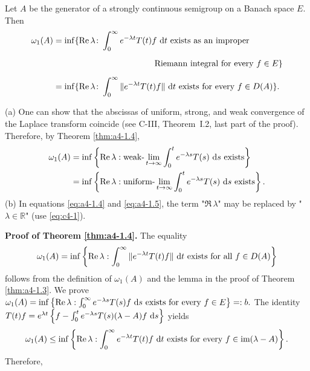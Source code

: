 \begin{theorem}\label{thm:a4-1.4}
Let $A$ be the generator of a strongly continuous semigroup on a Banach space $E$. 
Then
\begin{align}\label{eq:a4-1.4}
\omega_{1}(A) &= \inf\{\Re\,\lambda \colon \int_{0}^{\infty} e^{-\lambda t} T(t)f \,\dt \text{ exists as an improper} \\
&\phantom{= \inf\{\Re\,\lambda \colon \int_{0}^{\infty} e^{-\lambda t} T(t)f} \text{Riemann integral for every } f \in E\} \notag \\
&= \inf\{\Re\,\lambda \colon \int_{0}^{\infty} \|e^{-\lambda t} T(t)f\| \,\dt \text{ exists for every } f \in D(A)\}.\notag
\end{align}
\end{theorem}
\begin{remarks*}\label{rem:a4-1.4}
(a) One can show that the abscissas of uniform, strong, and weak convergence of the Laplace transform coincide (see C-III, Theorem~I.2, last part of the proof). 
Therefore, by Theorem \ref{thm:a4-1.4},
\begin{align}\label{eq:a4-1.5}
\omega_1(A) &= \inf \left\{ \mathop{}\!\mathrm{Re}\,\lambda : \text{weak-} \lim_{t \to \infty} \int_0^t e^{-\lambda s} T(s) \,\mathop{}\!\mathrm{d}{s} \text{ exists} \right\}
\\
    &= \inf \left\{ \mathop{}\!\mathrm{Re}\,\lambda : \text{uniform-} \lim_{t \to \infty} \int_0^t e^{-\lambda s} T(s) \,\mathop{}\!\mathrm{d}{s} \text{ exists} \right\}.\notag
\end{align}
\noindent
(b) In equations \eqref{eq:a4-1.4} and \eqref{eq:a4-1.5}, the term "\(\Re\,\lambda\)" may be replaced by "\(\lambda \in \mathbb{R}\)" (use \eqref{eq:c4-1}).
\end{remarks*}
\bigskip
\noindent
 \textbf{Proof of Theorem \ref{thm:a4-1.4}.} The equality 
 \[ 
 \omega_1(A) = \inf \left\{ \mathop{}\!\mathrm{Re}\,\lambda : \int_0^\infty \|e^{-\lambda t} T(t) f \| \,\mathop{}\!\mathrm{d}{t} \text{ exists for all } f \in D(A) \right\} 
 \] 
 follows from the definition of \(\omega_1(A)\) and the lemma in the proof of Theorem \ref{thm:a4-1.3}.
We prove 
\(
\omega_1(A) = \inf \left\{ \mathop{}\!\mathrm{Re}\,\lambda : \int_0^\infty e^{-\lambda s} T(s) f \,\mathop{}\!\mathrm{d}{s} \text{ exists for every } f \in E \right\}=: b. 
\)
The identity
\(    T(t) f = e^{\lambda t} \left\{ f - \int_0^t e^{-\lambda s} T(s) (\lambda - A) f \,\mathop{}\!\mathrm{d}{s} \right\}
\)
yields
\[
\omega_1(A) \leq \inf \left\{ \mathop{}\!\mathrm{Re}\,\lambda : \int_0^\infty e^{-\lambda t} T(t) f \,\mathop{}\!\mathrm{d}{t} \text{ exists for every } f \in \text{im} (\lambda - A) \right\}.
\]
Therefore,

